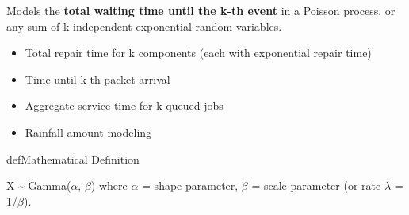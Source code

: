 \begin{Shaded}
\begin{Highlighting}[]
\OperatorTok{;}
\NormalTok{(}\OperatorTok{,} \OperatorTok{,} \OperatorTok{,} \OperatorTok{,} \NormalTok{)}\OperatorTok{;}
 \OperatorTok{;}
\NormalTok{(}\OperatorTok{,} \OperatorTok{,} \OperatorTok{,} \OperatorTok{,} \NormalTok{)}\OperatorTok{;}
\NormalTok{(}\NormalTok{)}\OperatorTok{;} \NormalTok{(}\NormalTok{)}\OperatorTok{;}
\NormalTok{(}\NormalTok{)}\OperatorTok{;}
\NormalTok{(}\OperatorTok{,} \NormalTok{)}\OperatorTok{;}
 \OperatorTok{;}
\end{Highlighting}
\end{Shaded}



Models the \textbf{total waiting time until the k-th event} in a Poisson process, or any sum of k independent exponential random variables.


\begin{itemize}
\tightlist
\item
  Total repair time for k components (each with exponential repair time)
\item
  Time until k-th packet arrival
\item
  Aggregate service time for k queued jobs
\item
  Rainfall amount modeling
\end{itemize}

\begin{PSbox}[unbreakable]{def}{Mathematical Definition}

X \textasciitilde{} Gamma(\ensuremath{\alpha}, \ensuremath{\beta}) where \ensuremath{\alpha} = shape parameter, \ensuremath{\beta} = scale parameter (or rate \ensuremath{\lambda} = 1/\ensuremath{\beta}).

\end{PSbox}

